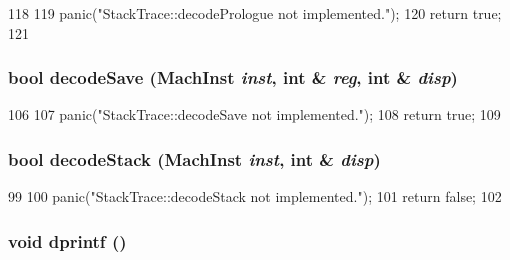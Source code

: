 \begin{DoxyCode}
118 {
119     panic("StackTrace::decodePrologue not implemented.\n");
120     return true;
121 }
\end{DoxyCode}
\hypertarget{classPowerISA_1_1StackTrace_ae56dad5982b67d8717714c383b6a59f8}{
\subsubsection[{decodeSave}]{\setlength{\rightskip}{0pt plus 5cm}bool decodeSave ({\bf MachInst} {\em inst}, \/  int \& {\em reg}, \/  int \& {\em disp})}}
\label{classPowerISA_1_1StackTrace_ae56dad5982b67d8717714c383b6a59f8}



\begin{DoxyCode}
106 {
107     panic("StackTrace::decodeSave not implemented.\n");
108     return true;
109 }
\end{DoxyCode}
\hypertarget{classPowerISA_1_1StackTrace_a61ba7618f77dc6e62d7b0baf6273130c}{
\subsubsection[{decodeStack}]{\setlength{\rightskip}{0pt plus 5cm}bool decodeStack ({\bf MachInst} {\em inst}, \/  int \& {\em disp})}}
\label{classPowerISA_1_1StackTrace_a61ba7618f77dc6e62d7b0baf6273130c}



\begin{DoxyCode}
99 {
100     panic("StackTrace::decodeStack not implemented.\n");
101     return false;
102 }
\end{DoxyCode}
\hypertarget{classPowerISA_1_1StackTrace_a70fdc8802b54b4244889a2d3553405d5}{
\subsubsection[{dprintf}]{\setlength{\rightskip}{0pt plus 5cm}void dprintf ()}}
\label{classPowerISA_1_1StackTrace_a70fdc8802b54b4244889a2d3553405d5}



